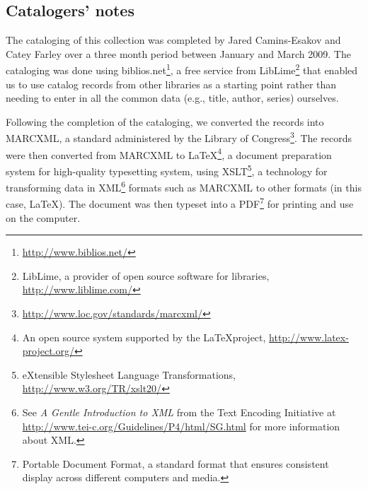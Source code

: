 \subsection*{Catalogers' notes}

The cataloging of this collection was completed by Jared Camins-Esakov and Catey
Farley over a three month period between January and March 2009. The cataloging
was done using {\ddag}biblios.net\footnote{\url{http://www.biblios.net/}}, a free
service from LibLime\footnote{LibLime, a provider of open source software
for libraries, \url{http://www.liblime.com/}} that enabled us to use catalog
records from other libraries as a starting point rather than needing to enter in
all the common data (e.g., title, author, series) ourselves.

Following the completion of the cataloging, we converted the records into MARCXML,
a standard administered by the Library of
Congress\footnote{\url{http://www.loc.gov/standards/marcxml/}}. The records were
then converted from MARCXML to \LaTeX\footnote{An open source system supported by
the \LaTeX project, \url{http://www.latex-project.org/}}, a document preparation
system for high-quality typesetting system, using XSLT\footnote{eXtensible
Stylesheet Language Transformations, \url{http://www.w3.org/TR/xslt20/}}, a
technology for transforming data in XML\footnote{See \emph{A Gentle Introduction
to XML} from the Text Encoding Initiative at
\url{http://www.tei-c.org/Guidelines/P4/html/SG.html} for more information about
XML.} formats such as MARCXML to other formats (in this case, \LaTeX). The document
was then typeset into a PDF\footnote{Portable Document Format, a standard format
that ensures consistent display across different computers and media.} for printing
and use on the computer.

